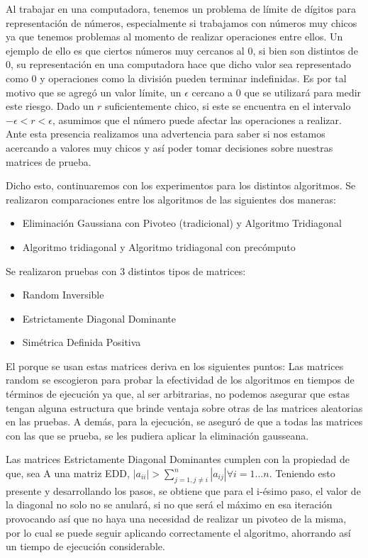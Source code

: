 Al trabajar en una computadora, tenemos un problema de límite de dígitos para representación de números, especialmente si trabajamos con números muy chicos ya que tenemos problemas al momento de realizar operaciones entre ellos.
Un ejemplo de ello es que ciertos números muy cercanos al 0, si bien son distintos de 0, su representación en una computadora hace que dicho valor sea representado como 0 y operaciones como la división pueden terminar indefinidas.
Es por tal motivo que se agregó un valor límite, un $\epsilon$ cercano a 0 que se utilizará para medir este riesgo. Dado un $r$ suficientemente chico, si este se encuentra en el intervalo $-\epsilon < r < \epsilon$, asumimos que el número puede afectar las operaciones a realizar.
Ante esta presencia realizamos una advertencia para saber si nos estamos acercando a valores muy chicos y así poder tomar decisiones sobre nuestras matrices de prueba.

Dicho esto, continuaremos con los experimentos para los distintos algoritmos.
Se realizaron comparaciones entre los algoritmos de las siguientes dos maneras:
\begin{itemize}
   \item Eliminación Gaussiana con Pivoteo (tradicional) y Algoritmo Tridiagonal
   \item Algoritmo tridiagonal y Algoritmo tridiagonal con precómputo
\end{itemize}

Se realizaron pruebas con 3 distintos tipos de matrices:
\begin{itemize}
   \item Random Inversible
   \item Estrictamente Diagonal Dominante
   \item Simétrica Definida Positiva
\end{itemize}

El porque se usan estas matrices deriva en los siguientes puntos:
Las matrices random se escogieron para probar la efectividad de los algoritmos en tiempos de términos de ejecución ya que, al ser arbitrarias, no podemos asegurar que estas tengan alguna estructura que brinde ventaja sobre otras de las matrices aleatorias en las pruebas. A demás, para la ejecución, se aseguró de que a todas las matrices con las que se prueba, se les pudiera aplicar la eliminación gausseana.

Las matrices Estrictamente Diagonal Dominantes cumplen con la propiedad de que, sea A una matriz EDD, $|a_{ii}| > \sum_{j = 1, j \neq i}^n |a_{ij}| \forall i=1\dots n$. Teniendo esto presente y desarrollando los pasos, se obtiene que para el i-ésimo paso, el valor de la diagonal no solo no se anulará, si no que será el máximo en esa iteración provocando así que no haya una necesidad de realizar un pivoteo de la misma, por lo cual se puede seguir aplicando correctamente el algoritmo, ahorrando así un tiempo de ejecución considerable.


